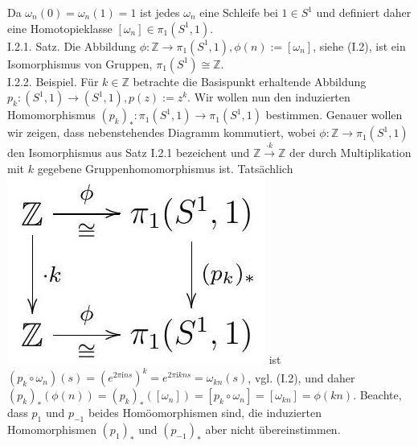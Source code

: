 \documentclass[10pt]{article}
\begin{document}
Da $\omega_{n}(0)=\omega_{n}(1)=1$ ist jedes $\omega_{n}$ eine Schleife bei $1 \in S^{1}$ und definiert daher eine Homotopieklasse $\left[\omega_{n}\right] \in \pi_{1}\left(S^{1}, 1\right)$.\\
I.2.1. Satz. Die Abbildung $\phi: \mathbb{Z} \rightarrow \pi_{1}\left(S^{1}, 1\right), \phi(n):=\left[\omega_{n}\right]$, siehe (I.2), ist ein Isomorphismus von Gruppen, $\pi_{1}\left(S^{1}\right) \cong \mathbb{Z}$.\\
I.2.2. Beispiel. Für $k \in \mathbb{Z}$ betrachte die Basispunkt erhaltende Abbildung $p_{k}:\left(S^{1}, 1\right) \rightarrow\left(S^{1}, 1\right), p(z):=z^{k}$. Wir wollen nun den induzierten Homomorphismus $\left(p_{k}\right)_{*}: \pi_{1}\left(S^{1}, 1\right) \rightarrow \pi_{1}\left(S^{1}, 1\right)$ bestimmen. Genauer wollen wir zeigen, dass nebenstehendes Diagramm kommutiert, wobei $\phi: \mathbb{Z} \rightarrow \pi_{1}\left(S^{1}, 1\right)$ den Isomorphismus aus Satz I.2.1 bezeichent und $\mathbb{Z} \xrightarrow{\cdot k} \mathbb{Z}$ der durch Multiplikation mit $k$ gegebene Gruppenhomomorphismus ist. Tatsächlich\\
\includegraphics[max width=\textwidth]{2025_06_05_d7ed2bacd1e9ce1db1f0g-014} ist $\left(p_{k} \circ \omega_{n}\right)(s)=\left(e^{2 \pi \mathrm{i} n s}\right)^{k}=e^{2 \pi \mathrm{i} k n s}=\omega_{k n}(s)$, vgl. (I.2), und daher $\left(p_{k}\right)_{*}(\phi(n))=\left(p_{k}\right)_{*}\left(\left[\omega_{n}\right]\right)=\left[p_{k} \circ \omega_{n}\right]=\left[\omega_{k n}\right]=\phi(k n)$. Beachte, dass $p_{1}$ und $p_{-1}$ beides Homöomorphismen sind, die induzierten Homomorphismen $\left(p_{1}\right)_{*}$ und $\left(p_{-1}\right)_{*}$ aber nicht übereinstimmen.
\end{document}

